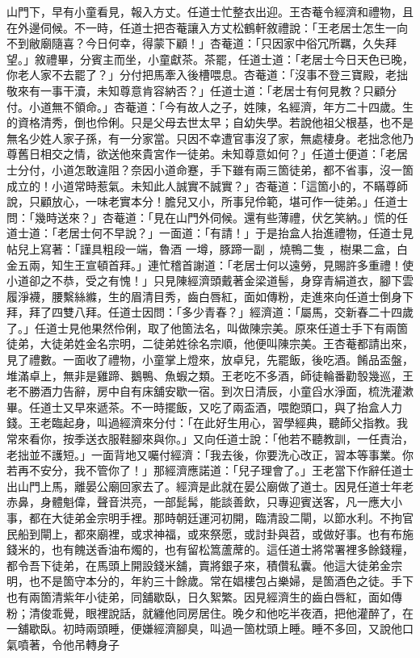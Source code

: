 \begin{showcontents}{}
山門下，早有小童看見，報入方丈。任道士忙整衣出迎。王杏菴令經濟和禮物，且在外邊伺候。不一時，任道士把杏菴讓入方丈松鶴軒敘禮說：「王老居士怎生一向不到敝廟隨喜？今日何幸，得蒙下顧！」杏菴道：「只因家中俗冗所羈，久失拜望。」敘禮畢，分賓主而坐，小童獻茶。茶罷，任道士道：「老居士今日天色已晚，你老人家不去罷了？」分付把馬牽入後槽喂息。杏菴道：「沒事不登三寶殿，老拙敬來有一事干瀆，未知尊意肯容納否？」任道士道：「老居士有何見教？只顧分付。小道無不領命。」杏菴道：「今有故人之子，姓陳，名經濟，年方二十四歲。生的資格清秀，倒也伶俐。只是父母去世太早；自幼失學。若說他祖父根基，也不是無名少姓人家子孫，有一分家當。只因不幸遭官事沒了家，無處棲身。老拙念他乃尊舊日相交之情，欲送他來貴宮作一徒弟。未知尊意如何？」任道士便道：「老居士分付，小道怎敢違阻？奈因小道命蹇，手下雖有兩三箇徒弟，都不省事，沒一箇成立的！小道常時惹氣。未知此人誠實不誠實？」杏菴道：「這箇小的，不瞞尊師說，只顧放心，一味老實本分！膽兒又小，所事兒伶範，堪可作一徒弟。」任道士問：「幾時送來？」杏菴道：「見在山門外伺候。還有些薄禮，伏乞笑納。」慌的任道士道：「老居士何不早說？」一面道：「有請！」于是抬盒人抬進禮物，任道士見帖兒上寫著：「謹具粗段一端，魯酒 一墫，豚蹄一副 ，燒鴨二隻 ，樹果二盒，白金五兩，知生王宣頓首拜。」連忙稽首謝道：「老居士何以遠勞，見賜許多重禮！使小道卻之不恭，受之有愧！」只見陳經濟頭戴著金梁道髻，身穿青絹道衣，腳下雲履淨襪，腰繫絲縧，生的眉清目秀，齒白唇紅，面如傳粉，走進來向任道士倒身下拜，拜了四雙八拜。任道士因問：「多少青春？」經濟道：「屬馬，交新春二十四歲了。」任道士見他果然伶俐，取了他箇法名，叫做陳宗美。原來任道士手下有兩箇徒弟，大徒弟姓金名宗明，二徒弟姓徐名宗順，他便叫陳宗美。王杏菴都請出來，見了禮數。一面收了禮物，小童掌上燈來，放卓兒，先罷飯，後吃酒。餚品盃盤，堆滿卓上，無非是雞蹄、鵝鴨、魚蝦之類。王老吃不多酒，師徒輪番勸彀幾巡，王老不勝酒力告辭，房中自有床舖安歇一宿。到次日清辰，小童舀水淨面，梳洗灌漱畢。任道士又早來遞茶。不一時擺飯，又吃了兩盃酒，喂飽頭口，與了抬盒人力錢。王老臨起身，叫過經濟來分付：「在此好生用心，習學經典，聽師父指教。我常來看你，按季送衣服鞋腳來與你。」又向任道士說：「他若不聽教訓，一任責治，老拙並不護短。」一面背地又囑付經濟：「我去後，你要洗心改正，習本等事業。你若再不安分，我不管你了！」那經濟應諾道：「兒子理會了。」王老當下作辭任道士出山門上馬，離晏公廟回家去了。經濟是此就在晏公廟做了道士。因見任道士年老赤鼻，身體魁偉，聲音洪亮，一部髭髯，能談善飲，只專迎賓送客，凡一應大小事，都在大徒弟金宗明手裡。那時朝廷運河初開，臨清設二閘，以節水利。不拘官民船到閘上，都來廟裡，或求神福，或來祭愿，或討卦與苕，或做好事。也有布施錢米的，也有餽送香油布燭的，也有留松篙蘆蓆的。這任道士將常署裡多餘錢糧，都令吾下徒弟，在馬頭上開設錢米舖，賣將銀子來，積儹私囊。他這大徒弟金宗明，也不是箇守本分的，年約三十餘歲。常在娼樓包占樂婦，是箇酒色之徒。手下也有兩箇清紫年小徒弟，同舖歇臥，日久絮繁。因見經濟生的齒白唇紅，面如傳粉；清俊乖覺，眼裡說話，就纏他同房居住。晚夕和他吃半夜酒，把他灌醉了，在一舖歇臥。初時兩頭睡，便嫌經濟腳臭，叫過一箇枕頭上睡。睡不多回，又說他口氣噴著，令他吊轉身子
\end{showcontents}
